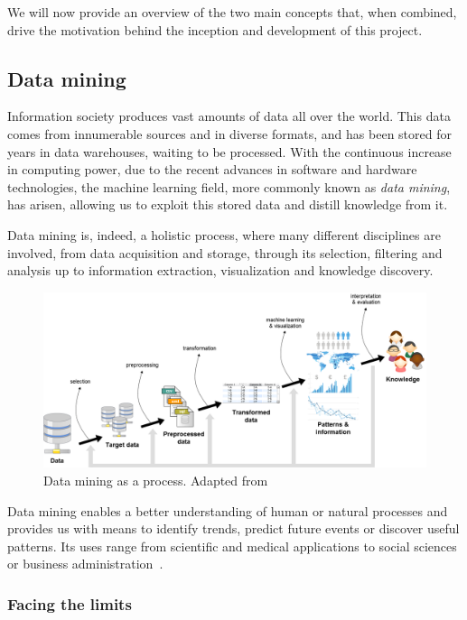 We will now provide an overview of the two main concepts that, when combined,
drive the motivation behind the inception and development of this project.

\subsection{Data mining}
\label{Introduction::Context::DataMining}

Information society produces vast amounts of data all over the world.
This data comes from innumerable sources and in diverse formats, and has been stored 
for years in data warehouses, waiting to be processed. With the continuous increase 
in computing power, due to the recent advances in software and hardware technologies, 
the machine learning field, more commonly known as \textit{data mining}, has arisen, 
allowing us to exploit this stored data and distill knowledge from it.

Data mining is, indeed, a holistic process, where many different disciplines are 
involved, from data acquisition and storage, through its selection, filtering and 
analysis up to information extraction, visualization and knowledge discovery.

\begin{figure}[h]
	\centering
	\includegraphics[width=0.9\linewidth]{Figures/data-mining-process.png}
	\caption{Data mining as a process. Adapted from~\citet{Fayyad:FromDataMining}}
	\label{fig:data-mining}
\end{figure}

Data mining enables a better understanding of human or natural processes and provides 
us with means to identify trends, predict future events or discover useful patterns. 
Its uses range from scientific and medical applications to social sciences or business
administration~\citep{Fayyad:FromDataMining}.

\subsubsection{Facing the limits}

